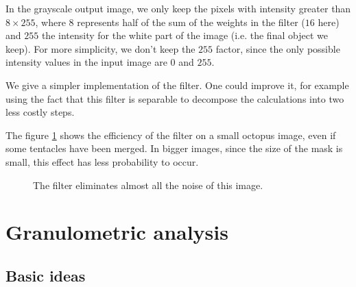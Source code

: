 In the grayscale output image, we only keep the pixels with intensity greater than $8 \times 255$, where $8$ represents half of the sum of the weights in the filter ($16$ here) and $255$ the intensity for the white part of the image (i.e. the final object we keep). For more simplicity, we don't keep the $255$ factor, since the only possible intensity values in the input image are $0$ and $255$.

We give a simpler implementation of the filter. One could improve it, for example using the fact that this filter is separable to decompose the calculations into two less costly steps.

The figure \ref{filter-exp} shows the efficiency of the filter on a small octopus image, even if some tentacles have been merged. In bigger images, since the size of the mask is small, this effect has less probability to occur.

\begin{figure}[!ht]
    \centering
    \qquad\qquad\qquad
    \caption{The filter eliminates almost all the noise of this image.}
    \label{filter-exp}
\end{figure}

\section{Granulometric analysis}

\subsection{Basic ideas}

